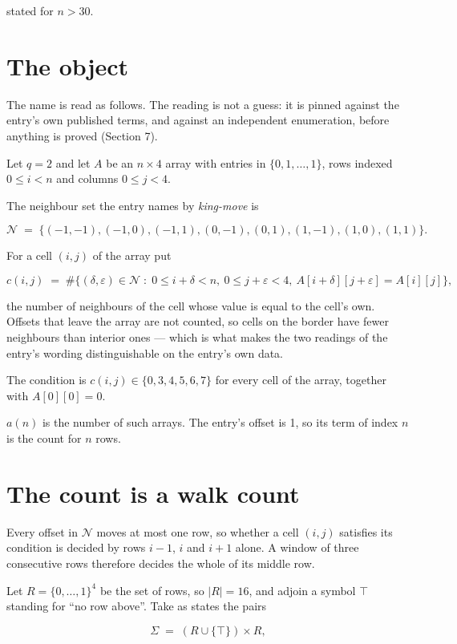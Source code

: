 \documentclass[11pt]{article}
\theoremstyle{definition}
\begin{document}
stated for $n > 30$.

\section{The object}

The name is read as follows. The reading is not a guess: it is pinned against the entry's own published terms, and against an independent enumeration, before anything is proved (Section 7).

Let $q = 2$ and let $A$ be an $n \times 4$ array with entries in $\{0,1,\dots,1\}$, rows indexed $0 \le i < n$ and columns $0 \le j < 4$.

The neighbour set the entry names by {\itshape king-move} is

\[\mathcal{N} \;=\; \{(-1,-1), (-1,0), (-1,1), (0,-1), (0,1), (1,-1), (1,0), (1,1)\}.\]

For a cell $(i,j)$ of the array put

\[c(i,j) \;=\; \#\bigl\{(\delta,\varepsilon)\in\mathcal{N} \;:\; 0\le i+\delta<n,\ 0\le j+\varepsilon<4,\ A[i+\delta][j+\varepsilon] = A[i][j]\bigr\},\]

the number of neighbours of the cell whose value is equal to the cell's own. Offsets that leave the array are not counted, so cells on the border have fewer neighbours than interior ones --- which is what makes the two readings of the entry's wording distinguishable on the entry's own data.

The condition is $c(i,j) \in \{0, 3, 4, 5, 6, 7\}$ for every cell of the array, together with $A[0][0]=0$.

$a(n)$ is the number of such arrays. The entry's offset is 1, so its term of index $n$ is the count for $n$ rows.

\section{The count is a walk count}

Every offset in $\mathcal{N}$ moves at most one row, so whether a cell $(i,j)$ satisfies its condition is decided by rows $i-1$, $i$ and $i+1$ alone. A window of three consecutive rows therefore decides the whole of its middle row.

Let $R = \{0,\dots,1\}^{4}$ be the set of rows, so $|R| = 16$, and adjoin a symbol $\top$ standing for ``no row above''. Take as states the pairs

\[\Sigma \;=\; (R \cup \{\top\}) \times R,\]
\end{document}
